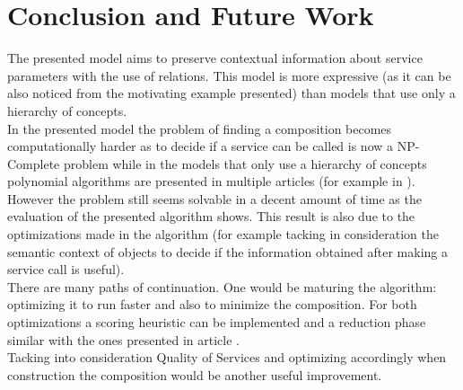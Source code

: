 \documentclass[12pt]{article}
\theoremstyle{definition}
\begin{document}
\section{Conclusion and Future Work}
The presented model aims to preserve contextual information about service parameters with the use of relations. This model is more expressive (as it can be also noticed from the motivating example presented) than models that use only a hierarchy of concepts. \\
In the presented model the problem of finding a composition becomes computationally harder as to decide if a service can be called is now a NP-Complete problem while in the models that only use a hierarchy of concepts polynomial algorithms are presented in multiple articles (for example in \cite{eu}). \\
However the problem still seems solvable in a decent amount of time as the evaluation of the presented algorithm shows. This result is also due to the optimizations made in the algorithm (for example tacking in consideration the semantic context of objects to decide if the information obtained after making a service call is useful).\\
There are many paths of continuation. One would be maturing the algorithm: optimizing it to run faster and also to minimize the composition. For both optimizations a scoring heuristic can be implemented and a reduction phase similar with the ones presented in article \cite{paul}. \\
Tacking into consideration Quality of Services \cite{2009} and optimizing accordingly when construction the composition would be another useful improvement.\\
\newpage


\end{document}
